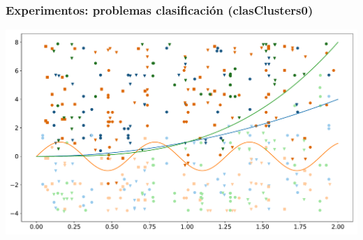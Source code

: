 \documentclass[aspectratio=43,spanish]{beamer}
\newcommand{\fdata}[1]{\textsf{#1}}
\begin{document}
\begin{frame}
      \frametitle{Experimentos: problemas clasificación (\fdata{clasClusters0})}

      \centering
      \includegraphics[width=.8\textwidth]{Chapter6/IGPL2022/clasClusters__0.pdf}


\end{frame}
\end{document}
